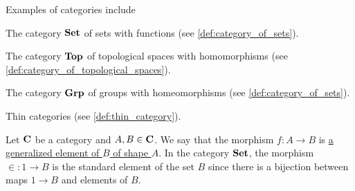 \begin{definition}\label{ex:categories}
  Examples of categories include

  \begin{defenum}
    \item The category $\operatorname{\mathbf{Set}}$ of sets with functions (see \cref{def:category_of_sets}).
    \item The category $\operatorname{\mathbf{Top}}$ of topological spaces with homomorphisms (see \cref{def:category_of_topological_spaces}).
    \item The category $\operatorname{\mathbf{Grp}}$ of groups with homeomorphisms (see \cref{def:category_of_sets}).
    \item Thin categories (see \cref{def:thin_category}).
  \end{defenum}
\end{definition}

\begin{definition}\label{def:generalized_element}\cite[definition 4.1.25]{Leinster2014}
  Let $\operatorname{\mathbf{C}}$ be a category and $A, B \in \operatorname{\mathbf{C}}$. We say that the morphism $f: A \to B$ is \uline{a generalized element of $B$ of shape $A$}. In the category $\operatorname{\mathbf{Set}}$, the morphism $\in : 1 \to B$ is the standard element of the set $B$ since there is a bijection between maps $1 \to B$ and elements of $B$.
\end{definition}

